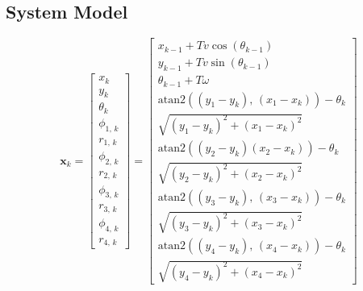 \documentclass{ieeeaccess}
\begin{document}
\subsection{System Model}
	\begin{equation}
	\label{eq:xsys}
		\boldsymbol{x}_{ k} = 
		\begin{bmatrix}
			x _{ k}	\\
			y_{ k}		\\
			\theta_{ k}	\\
			\phi_{1,\,k}	\\
			r_{1,\,k}	\\
			\phi_{2,\,k}	\\
			r_{2,\,k}	\\
			\phi_{3,\,k}	\\
			r_{3,\,k}	\\
			\phi_{4,\,k}	\\
			r_{4,\,k}
		\end{bmatrix}
		=
		\begin{bmatrix}
			x_{k-1}+Tv\cos{\left(\theta_{k-1}\right)}								\\
			y_{k-1}+Tv\sin{\left(\theta_{k-1}\right)}								\\
			\theta_{k-1} + T\omega											\\
			\text{atan2}\left(\left(y_{1} - y_{k}\right),\,\left(x_{1} -x_{k}\right)\right) - \theta_{k}	\\
			\sqrt{\left(y_{1} - y_{k}\right)^{2}+\left(x_{1} - x_{k}\right)^{2}}				\\
			\text{atan2}\left(\left(y_{2} - y_{k}\right)\left(x_{2} -x_{k}\right)\right) - \theta_{k}		\\
			\sqrt{\left(y_{2} - y_{k}\right)^{2}+\left(x_{2} - x_{k}\right)^{2}}				\\
			\text{atan2}\left(\left(y_{3} - y_{k}\right),\,\left(x_{3} -x_{k}\right)\right) - \theta_{k}	\\
			\sqrt{\left(y_{3} - y_{k}\right)^{2}+\left(x_{3} - x_{k}\right)^{2}}				\\
			\text{atan2}\left(\left(y_{4} - y_{k}\right),\,\left(x_{4} -x_{k}\right)\right) - \theta_{k}	\\
			\sqrt{\left(y_{4} - y_{k}\right)^{2}+\left(x_{4} - x_{k}\right)^{2}}
		\end{bmatrix}
	\end{equation}
	
\end{document}

